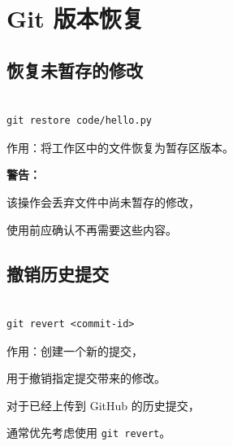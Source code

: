 



\section{Git 版本恢复}



\subsection{恢复未暂存的修改}



\begin{lstlisting}

git restore code/hello.py

\end{lstlisting}



作用：将工作区中的文件恢复为暂存区版本。



\textbf{警告：}

该操作会丢弃文件中尚未暂存的修改，

使用前应确认不再需要这些内容。



\subsection{撤销历史提交}



\begin{lstlisting}

git revert <commit-id>

\end{lstlisting}



作用：创建一个新的提交，

用于撤销指定提交带来的修改。



对于已经上传到 GitHub 的历史提交，

通常优先考虑使用 \texttt{git revert}。











